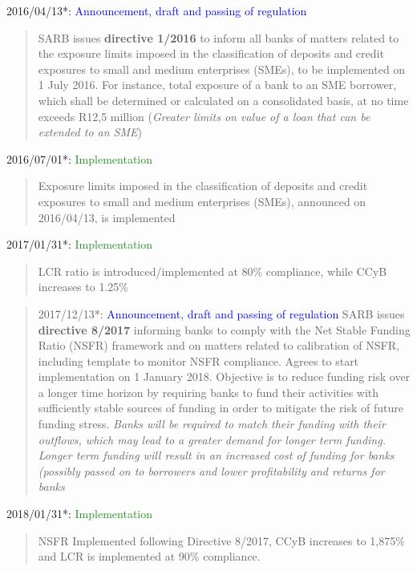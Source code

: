 \documentclass[
  letterpaper,
  DIV=11,
  numbers=noendperiod]{scrartcl}
\begin{document}
2016/04/13*:
\textcolor{blue}{Announcement, draft and passing of regulation}

\begin{quote}
SARB issues \textbf{directive 1/2016} to inform all banks of matters related to the exposure limits imposed in the classification of deposits and credit exposures to small and medium enterprises  (SMEs), to be implemented on 1 July 2016. For instance, total exposure of a bank to an SME borrower, which shall be determined or calculated on a consolidated basis, at no time exceeds R12,5 million (\textit{Greater limits on value of a loan that can be extended to an SME})
\end{quote}

2016/07/01*: \textcolor{ForestGreen}{Implementation}

\begin{quote}
Exposure limits imposed in the classification of deposits and credit exposures to small and medium enterprises  (SMEs), announced on 2016/04/13, is implemented
\end{quote}

2017/01/31*: \textcolor{ForestGreen}{Implementation}

\begin{quote}
LCR ratio is introduced/implemented at 80\% compliance, while CCyB increases to 1.25\%
\end{quote}

\begin{quote}
2017/12/13*: \textcolor{blue}{Announcement, draft and passing of regulation}
SARB issues \textbf{directive 8/2017} informing banks to comply with the Net Stable Funding Ratio (NSFR) framework and on matters related to calibration of NSFR, including  template to monitor NSFR compliance. Agrees to start implementation on 1 January 2018. Objective is to reduce funding risk over a longer time horizon by requiring banks to fund their activities with sufficiently stable sources of funding in order to mitigate the risk of future funding stress. \textit{Banks will be required to match their funding with their outflows, which may lead to a greater demand for longer term funding. Longer term funding will result in an increased cost of funding for banks (possibly passed on to borrowers and lower profitability and returns for banks}
\end{quote}

2018/01/31*: \textcolor{ForestGreen}{Implementation}

\begin{quote}
NSFR Implemented following  Directive 8/2017, CCyB increases to 1,875\% and LCR is implemented at 90\% compliance.
\end{quote}
\end{document}
